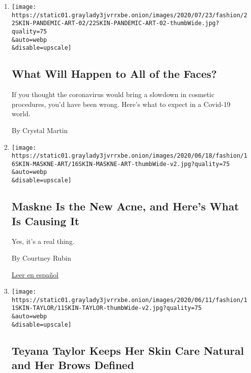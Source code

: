 \begin{enumerate}
\def\labelenumi{\arabic{enumi}.}
\item
  \href{/2020/07/23/style/skin-care-plastic-surgery-what-will-happen-to-all-of-the-faces.html}{}

  \texttt{[image: https://static01.graylady3jvrrxbe.onion/images/2020/07/23/fashion/22SKIN-PANDEMIC-ART-02/22SKIN-PANDEMIC-ART-02-thumbWide.jpg?quality=75\\\&auto=webp\\\&disable=upscale]}

  \hypertarget{what-will-happen-to-all-of-the-faces}{%
  \subsection{What Will Happen to All of the
  Faces?}\label{what-will-happen-to-all-of-the-faces}}

  If you thought the coronavirus would bring a slowdown in cosmetic
  procedures, you'd have been wrong. Here's what to expect in a Covid-19
  world.

  By Crystal Martin
\item
  \href{/article/maskne-acne.html}{}

  \texttt{[image: https://static01.graylady3jvrrxbe.onion/images/2020/06/18/fashion/16SKIN-MASKNE-ART/16SKIN-MASKNE-ART-thumbWide-v2.jpg?quality=75\\\&auto=webp\\\&disable=upscale]}

  \hypertarget{maskne-is-the-new-acne-and-heres-what-is-causing-it}{%
  \subsection{Maskne Is the New Acne, and Here's What Is Causing
  It}\label{maskne-is-the-new-acne-and-heres-what-is-causing-it}}

  Yes, it's a real thing.

  By Courtney Rubin

  \href{https://www.nytimes3xbfgragh.onion/es/2020/06/20/espanol/estilos-de-vida/mascarilla-acne-maskne.html}{Leer
  en español}
\item
  \href{/2020/06/10/style/teyana-taylor-keeps-her-skin-care-natural-and-her-brows-defined.html}{}

  \texttt{[image: https://static01.graylady3jvrrxbe.onion/images/2020/06/11/fashion/11SKIN-TAYLOR/11SKIN-TAYLOR-thumbWide-v2.jpg?quality=75\\\&auto=webp\\\&disable=upscale]}

  \hypertarget{teyana-taylor-keeps-her-skin-care-natural-and-her-brows-defined}{%
  \subsection{Teyana Taylor Keeps Her Skin Care Natural and Her Brows
  Defined}\label{teyana-taylor-keeps-her-skin-care-natural-and-her-brows-defined}}


\end{enumerate}
